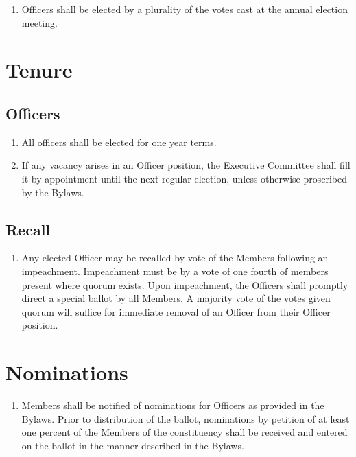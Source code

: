 \begin{enumerate}
	\item Officers shall be elected by a plurality of the votes cast at the annual election meeting.
\end{enumerate}

\section{Tenure}

\subsection{Officers}
\begin{enumerate}
	\item All officers shall be elected for one year terms.
	\item If any vacancy arises in an Officer position, the Executive Committee shall fill it by appointment until the next regular election, unless otherwise proscribed by the Bylaws.
\end{enumerate}

\subsection{Recall}
\begin{enumerate}
	\item Any elected Officer may be recalled by vote of the Members following an impeachment. Impeachment must be by a vote of one fourth of members present where quorum exists. Upon impeachment, the Officers shall promptly direct a special ballot by all Members. A majority vote of the votes given quorum will suffice for immediate removal of an Officer from their Officer position.
\end{enumerate}

\section{Nominations}
\begin{enumerate}
	\item Members shall be notified of nominations for Officers as provided in the Bylaws. Prior to distribution of the ballot, nominations by petition of at least one percent of the Members of the constituency shall be received and entered on the ballot in the manner described in the Bylaws.
\end{enumerate}

